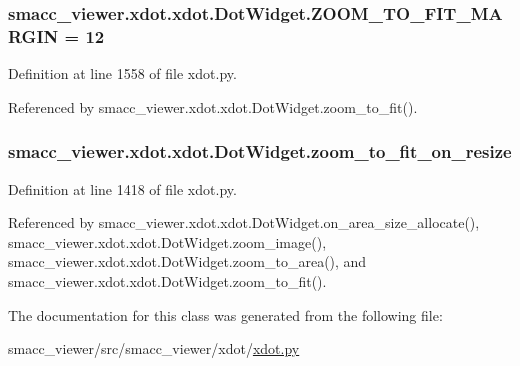 \subsubsection[{\texorpdfstring{Z\+O\+O\+M\+\_\+\+T\+O\+\_\+\+F\+I\+T\+\_\+\+M\+A\+R\+G\+IN}{ZOOM_TO_FIT_MARGIN}}]{ smacc\+\_\+viewer.\+xdot.\+xdot.\+Dot\+Widget.\+Z\+O\+O\+M\+\_\+\+T\+O\+\_\+\+F\+I\+T\+\_\+\+M\+A\+R\+G\+IN = 12\hspace{0.3cm}{\ttfamily [static]}}\hypertarget{classsmacc__viewer_1_1xdot_1_1xdot_1_1DotWidget_a2b9e2bf1dbf6eb9fa2311e8762387606}{}\label{classsmacc__viewer_1_1xdot_1_1xdot_1_1DotWidget_a2b9e2bf1dbf6eb9fa2311e8762387606}


Definition at line 1558 of file xdot.\+py.



Referenced by smacc\+\_\+viewer.\+xdot.\+xdot.\+Dot\+Widget.\+zoom\+\_\+to\+\_\+fit().

\subsubsection[{\texorpdfstring{zoom\+\_\+to\+\_\+fit\+\_\+on\+\_\+resize}{zoom_to_fit_on_resize}}]{\setlength{\rightskip}{0pt plus 5cm}smacc\+\_\+viewer.\+xdot.\+xdot.\+Dot\+Widget.\+zoom\+\_\+to\+\_\+fit\+\_\+on\+\_\+resize}\hypertarget{classsmacc__viewer_1_1xdot_1_1xdot_1_1DotWidget_ab593e704812a8e15cde5ac909458fb91}{}\label{classsmacc__viewer_1_1xdot_1_1xdot_1_1DotWidget_ab593e704812a8e15cde5ac909458fb91}


Definition at line 1418 of file xdot.\+py.



Referenced by smacc\+\_\+viewer.\+xdot.\+xdot.\+Dot\+Widget.\+on\+\_\+area\+\_\+size\+\_\+allocate(), smacc\+\_\+viewer.\+xdot.\+xdot.\+Dot\+Widget.\+zoom\+\_\+image(), smacc\+\_\+viewer.\+xdot.\+xdot.\+Dot\+Widget.\+zoom\+\_\+to\+\_\+area(), and smacc\+\_\+viewer.\+xdot.\+xdot.\+Dot\+Widget.\+zoom\+\_\+to\+\_\+fit().



The documentation for this class was generated from the following file\+:\begin{DoxyCompactItemize}
\item 
smacc\+\_\+viewer/src/smacc\+\_\+viewer/xdot/\hyperlink{xdot_8py}{xdot.\+py}\end{DoxyCompactItemize}
